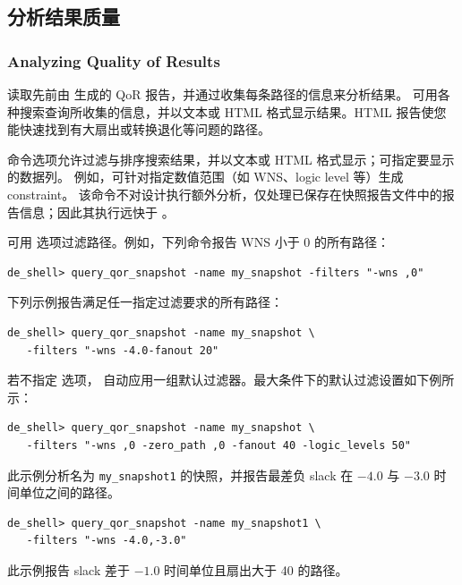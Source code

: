 \subsection{分析结果质量}
\subsubsection*{Analyzing Quality of Results}

 读取先前由  生成的 QoR 报告，并通过收集每条路径的信息来分析结果。
可用各种搜索查询所收集的信息，并以文本或 HTML 格式显示结果。HTML 报告使您能快速找到有大扇出或转换退化等问题的路径。

命令选项允许过滤与排序搜索结果，并以文本或 HTML 格式显示；可指定要显示的数据列。
例如，可针对指定数值范围（如 WNS、logic level 等）生成  constraint。
该命令不对设计执行额外分析，仅处理已保存在快照报告文件中的报告信息；因此其执行远快于 。

可用  选项过滤路径。例如，下列命令报告 WNS 小于 0 的所有路径：
\begin{lstlisting}
de_shell> query_qor_snapshot -name my_snapshot -filters "-wns ,0"
\end{lstlisting}

下列示例报告满足任一指定过滤要求的所有路径：
\begin{lstlisting}
de_shell> query_qor_snapshot -name my_snapshot \
   -filters "-wns -4.0-fanout 20"
\end{lstlisting}

若不指定  选项， 自动应用一组默认过滤器。最大条件下的默认过滤设置如下例所示：
\begin{lstlisting}
de_shell> query_qor_snapshot -name my_snapshot \
   -filters "-wns ,0 -zero_path ,0 -fanout 40 -logic_levels 50"
\end{lstlisting}

此示例分析名为 \texttt{my\_snapshot1} 的快照，并报告最差负 slack 在 $-4.0$ 与 $-3.0$ 时间单位之间的路径。

\begin{lstlisting}[caption={报告具有最差负 Slack 的路径},label=ex:qor-wns]
de_shell> query_qor_snapshot -name my_snapshot1 \
   -filters "-wns -4.0,-3.0"
\end{lstlisting}

此示例报告 slack 差于 $-1.0$ 时间单位且扇出大于 40 的路径。

